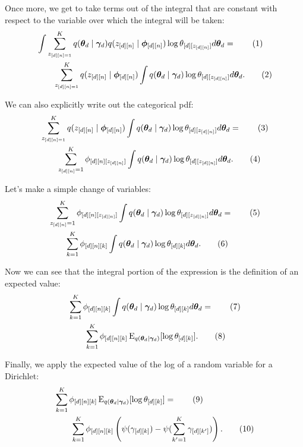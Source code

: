 \documentclass[12pt]{article}
\newcommand\numberthis{\addtocounter{equation}{1}\tag{\theequation}}
\newcommand{\E}{\operatorname{E}}
\begin{document}
Once more, we get to take terms out of the integral that are constant with
respect to the variable over which the integral will be taken:
\begin{align*}
    &\int
    \sum_{z_{[d][n]=1}}^{K}
    q(\bm{\theta}_{d} \mid \bm{\gamma}_{d}) q(z_{[d][n]}
    \mid \bm{\phi}_{[d][n]})\log \theta_{[d][z_{[d][n]}]}
    d\bm{\theta}_{d} = \numberthis \\
    &\quad\quad\sum_{z_{[d][n]=1}}^{K}q(z_{[d][n]} \mid \bm{\phi}_{[d][n]})
    \int q(\bm{\theta}_{d} \mid \bm{\gamma}_{d}) \log \theta_{[d][z_{[d][n]}]}
    d\bm{\theta}_{d}. \numberthis
\end{align*}

We can also explicitly write out the categorical pdf:
\begin{align*}
    &\sum_{z_{[d][n]=1}}^{K}q(z_{[d][n]} \mid \bm{\phi}_{[d][n]})
    \int q(\bm{\theta}_{d} \mid \bm{\gamma}_{d}) \log \theta_{[d][z_{[d][n]}]}
    d\bm{\theta}_{d} = \numberthis \\
    &\quad\quad\sum_{z_{[d][n]}=1}^{K} \phi_{[d][n][z_{[d][n]}]}
    \int q(\bm{\theta}_{d} \mid \bm{\gamma}_{d}) \log \theta_{[d][z_{[d][n]}]}
    d\bm{\theta}_{d}. \numberthis
\end{align*}

Let's make a simple change of variables:
\begin{align*}
    &\sum_{z_{[d][n]}=1}^{K} \phi_{[d][n][z_{[d][n]}]}
    \int q(\bm{\theta}_{d} \mid \bm{\gamma}_{d}) \log \theta_{[d][z_{[d][n]}]}
    d\bm{\theta}_{d} = \numberthis \\
    &\quad\quad\sum_{k=1}^{K} \phi_{[d][n][k]}
    \int q(\bm{\theta}_{d} \mid \bm{\gamma}_{d}) \log \theta_{[d][k]}
    d\bm{\theta}_{d}. \numberthis \\
\end{align*}

Now we can see that the integral portion of the expression is the definition of
an expected value:
\begin{align*}
    &\sum_{k=1}^{K} \phi_{[d][n][k]}
    \int q(\bm{\theta}_{d} \mid \bm{\gamma}_{d}) \log \theta_{[d][k]}
    d\bm{\theta}_{d} = \numberthis \\
    &\quad\quad\sum_{k=1}^{K} \phi_{[d][n][k]}
    \E_{q(\bm{\theta}_{d} \mid \bm{\gamma}_{d})}[ \log \theta_{[d][k]} ]
    . \numberthis \\
\end{align*}

Finally, we apply the expected value of the log of a random variable for a
Dirichlet:
\begin{align*}
    &\sum_{k=1}^{K} \phi_{[d][n][k]}
    \E_{q(\bm{\theta}_{d} \mid \bm{\gamma}_{d})}[ \log \theta_{[d][k]} ]
    = \numberthis \\
    &\quad\quad\sum_{k=1}^{K} \phi_{[d][n][k]}
    \left(\psi(\gamma_{[d][k]}) - \psi(\sum_{k'=1}^{K} \gamma_{[d][k']})\right)
    . \numberthis\label{eq:expectedlogtheta} \\
\end{align*}
\end{document}
